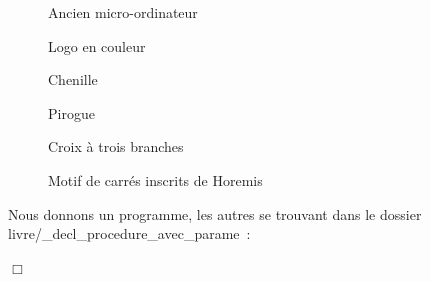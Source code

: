 \vfill
\begin{figure}[h]
 \caption{Ancien micro-ordinateur}
\end{figure}
\mbox{}
\newpage
\begin{figure}[!h]
%
\caption{Logo en couleur}%
\end{figure}
\begin{figure}[!h]
%
\caption{Chenille}%
\end{figure}
\begin{figure}[!h]
%
\caption{Pirogue}%
\end{figure}
\vfil
\begin{figure}[!h]
%
\caption{Croix à trois branches}%
\label{fig:crx3b}%
\end{figure}
\onecolumn
\begin{figure}[h]
 \caption{Motif de carrés inscrits de Horemis}\label{fig:carinspt}
\end{figure}
\begin{corrige}{
Nous donnons un programme, les autres se trouvant dans le dossier 
{\idt livre/\_decl\_procedure\_avec\_parame}~:
\label{prog:HeliceEnCouleur}

\noindent $\Box$}\end{corrige}

\vfill

